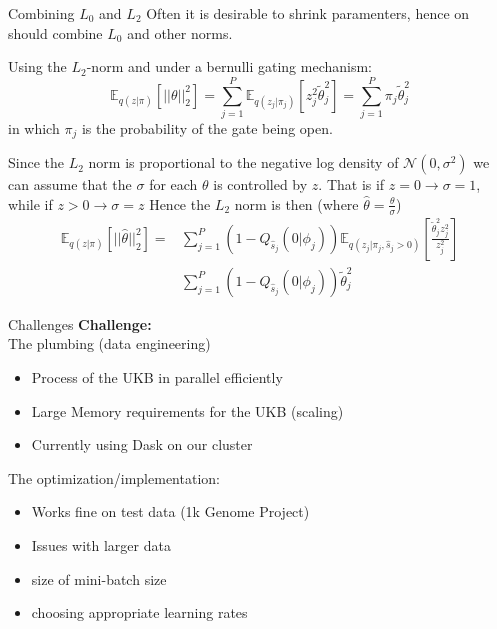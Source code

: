 \documentclass{beamer}
\begin{document}
\begin{frame}[t]{Combining $L_0$ and $L_2$}
  \small
  Often it is desirable to shrink paramenters, hence on should combine $L_0$ and other norms.
  
  Using the $L_2$-norm and under a bernulli gating mechanism:
  \begin{equation}
    \mathbb{E}_{q(z|\pi)} [||\theta||^2_2] = \sum^P_{j=1} \mathbb{E}_{q(z_j|\pi_j)} [z_j^2\tilde{\theta}^2_j] = \sum^P_{j=1} \pi_j \tilde{\theta}^2_j
  \end{equation}
  in which $\pi_j$ is the probability of the gate being open.

  Since the $L_2$ norm is proportional to the negative log density of $\mathcal{N}(0, \sigma^2)$ we can assume that the $\sigma$ for each $\theta$ is controlled by $z$.
  That is if $z=0 \rightarrow \sigma=1$, while if $z > 0 \rightarrow \sigma = z$
  Hence the $L_2$ norm is then (where $\hat{\theta} = \frac{\theta}{\sigma}$)
  \begin{equation}
    \begin{split}
      \mathbb{E}_{q(z|\pi)} [||\hat{\theta}||^2_2] =  & \sum^P_{j=1} (1 - Q_{\hat{s}_j}(0 | \phi_j)) \mathbb{E}_{q(z_j|\pi_j, \hat{s}_j > 0)} [\frac{\tilde{\theta}^2_j z^2_j}{z^2_j}] \\
                                                & \sum^P_{j=1} (1 - Q_{\hat{s}_j}(0 | \phi_j)) \tilde{\theta}^2_j
      \end{split}
  \end{equation}
  
\end{frame}

\begin{frame}[t]{Challenges}
  \textbf{Challenge:} \\
  The plumbing (data engineering)
  \\
  \begin{itemize}
    \item Process of the UKB in parallel efficiently
    \item Large Memory requirements for the UKB (scaling)
    \item Currently using Dask on our cluster
  \end{itemize}
  The optimization/implementation:
  \begin{itemize}
    \item Works fine on test data (1k Genome Project)
    \item Issues with larger data
    \item size of mini-batch size
    \item choosing appropriate learning rates
  \end{itemize}
\end{frame}
\end{document}
